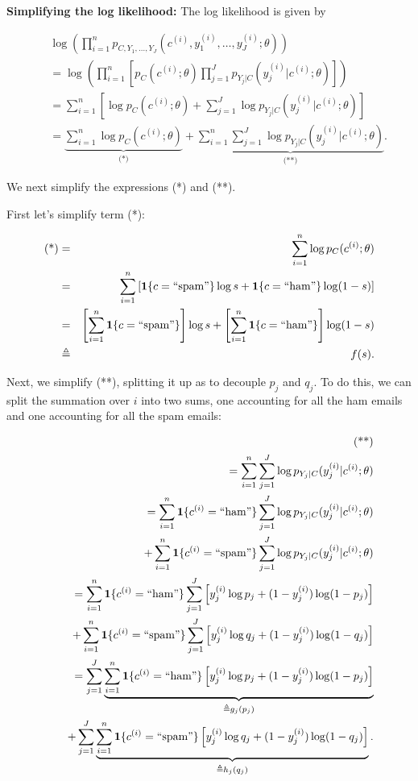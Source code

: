 \textbf{Simplifying the log likelihood:} The log likelihood is given by

\begin{eqnarray*}
&&\log\left(\prod_{i=1}^{n}p_{C,Y_{1},\dots,Y_{J}}(c^{(i)},y_{1}^{(i)},\dots,y_{J}^{(i)};\theta)\right)\nonumber \\
&&=\log\left(\prod_{i=1}^{n}\left[p_{C}(c^{(i)};\theta)\prod_{j=1}^{J}p_{Y_{j}|C}(y_{j}^{(i)}|c^{(i)};\theta)\right]\right)\nonumber \\
&&=\sum_{i=1}^{n}\left[\log p_{C}(c^{(i)};\theta)+\sum_{j=1}^{J}\log p_{Y_{j}|C}(y_{j}^{(i)}|c^{(i)};\theta)\right]\nonumber \\
&&=\underbrace{\sum_{i=1}^{n}\log p_{C}(c^{(i)};\theta)}_{\text{(*)}}+
\underbrace{\sum_{i=1}^{n}\sum_{j=1}^{J}\log p_{Y_{j}|C}(y_{j}^{(i)}|c^{(i)};\theta)}_{\text{(**)}}.
\end{eqnarray*}

We next simplify the expressions (*) and (**).

First let's simplify term (*):

\begin{eqnarray*}
\text{(*)} &=&\sum_{i=1}^{n}\log p_{C}(c^{(i)};\theta) \\
&=&\sum_{i=1}^{n}\left[\mathbf{1}\{c=``\text{spam}"\}\log s+\mathbf{1}\{c=``\text{ham}"\}\log(1-s)\right]\\
&=&\left[\sum_{i=1}^{n}\mathbf{1}\{c=``\text{spam}"\}\right]\log s+\left[\sum_{i=1}^{n}\mathbf{1}\{c=``\text{ham}"\}\right]\log(1-s)\\
&\triangleq& f(s).
\end{eqnarray*}

Next, we simplify (**), splitting it up as to decouple $p_j$ and $q_j$. To do this, we can split the summation over $i$ into two sums, one accounting for all the ham emails and one accounting for all the spam emails:

\begin{eqnarray*}
&&\text{(**)} \\
&&=\sum_{i=1}^{n}\sum_{j=1}^{J}\log p_{Y_{j}|C}(y_{j}^{(i)}|c^{(i)};\theta)\\
&&=\sum_{i=1}^{n}\mathbf{1}\{c^{(i)}=``\text{ham}"\}\sum_{j=1}^{J}\log p_{Y_{j}|C}(y_{j}^{(i)}|c^{(i)};\theta)\\
&&\quad+\sum_{i=1}^{n}\mathbf{1}\{c^{(i)}=``\text{spam}"\}\sum_{j=1}^{J}\log p_{Y_{j}|C}(y_{j}^{(i)}|c^{(i)};\theta)\\
&&=\sum_{i=1}^{n}\mathbf{1}\{c^{(i)}=``\text{ham}"\}\sum_{j=1}^{J}\left[y_{j}^{(i)}\log p_{j}+(1-y_{j}^{(i)})\log(1-p_{j})\right]\\
&&\quad+\sum_{i=1}^{n}\mathbf{1}\{c^{(i)}=``\text{spam}"\}\sum_{j=1}^{J}\left[y_{j}^{(i)}\log q_{j}+(1-y_{j}^{(i)})\log(1-q_{j})\right] \\
&&=\sum_{j=1}^{J}\underbrace{\sum_{i=1}^{n}\mathbf{1}\{c^{(i)}=``\text{ham}"\}\left[y_{j}^{(i)}\log p_{j}+(1-y_{j}^{(i)})\log(1-p_{j})\right]}_{\triangleq g_{j}(p_{j})}\\
&&\quad+\sum_{j=1}^{J}\underbrace{\sum_{i=1}^{n}\mathbf{1}\{c^{(i)}=``\text{spam}"\}\left[y_{j}^{(i)}\log q_{j}+(1-y_{j}^{(i)})\log(1-q_{j})\right]}_{\triangleq h_{j}(q_{j})}.
\end{eqnarray*}

